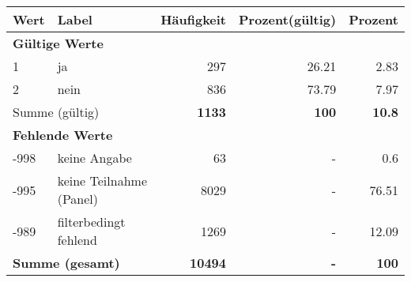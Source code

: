      \begin{longtable}{lXrrr}
     \toprule
     \textbf{Wert} & \textbf{Label} & \textbf{Häufigkeit} & \textbf{Prozent(gültig)} & \textbf{Prozent} \\
     \endhead
     \midrule
     \multicolumn{5}{l}{\textbf{Gültige Werte}}\\

     1 &
     \multicolumn{1}{X}{ ja   } &


       \num{297} &
       \num[round-mode=places,round-precision=2]{26,21} &
         \num[round-mode=places,round-precision=2]{2,83} \\

     2 &
     \multicolumn{1}{X}{ nein   } &


       \num{836} &
       \num[round-mode=places,round-precision=2]{73,79} &
         \num[round-mode=places,round-precision=2]{7,97} \\
     \midrule
     \multicolumn{2}{l}{Summe (gültig)} &
       \textbf{\num{1133}} &
     \textbf{100} &
       \textbf{\num[round-mode=places,round-precision=2]{10,8}} \\
     \multicolumn{5}{l}{\textbf{Fehlende Werte}}\\
       -998 &
       keine Angabe &
         \num{63} &
        - &
         \num[round-mode=places,round-precision=2]{0,6} \\
       -995 &
       keine Teilnahme (Panel) &
         \num{8029} &
        - &
         \num[round-mode=places,round-precision=2]{76,51} \\
       -989 &
       filterbedingt fehlend &
         \num{1269} &
        - &
         \num[round-mode=places,round-precision=2]{12,09} \\
     \midrule
     \multicolumn{2}{l}{\textbf{Summe (gesamt)}} &
          \textbf{\num{10494}} &
        \textbf{-} &
        \textbf{100} \\
     \bottomrule
     \end{longtable}
     
